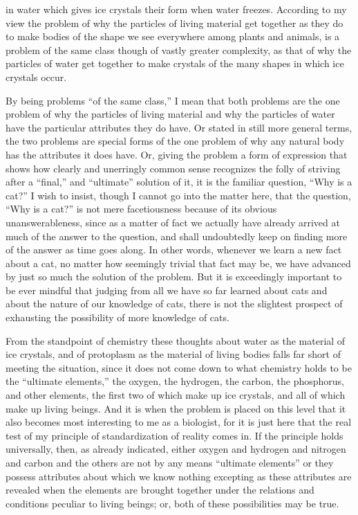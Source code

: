 \documentclass[a4paper, 11pt, oneside, polutonikogreek, english]{article}
\begin{document}
in water which gives ice crystals their form when water freezes. According to my view the problem of why the particles of living material get together as they do to make bodies of the shape we see everywhere among plants and animals, is a problem of the same class though of vastly greater complexity, as that of why the particles of water get together to make crystals of the many shapes in which ice crystals occur.

By being problems ``of the same class,'' I mean that both problems are the one problem of why the particles of living material and why the particles of water have the particular attributes they do have. Or stated in still more general terms, the two problems are special forms of the one problem of why any natural body has the attributes it does have. Or, giving the problem a form of expression that shows how clearly and unerringly common sense recognizes the folly of striving after a ``final,'' and ``ultimate'' solution of it, it is the familiar question, ``Why is a cat?'' I wish to insist, though I cannot go into the matter here, that the question, ``Why is a cat?'' is not mere facetiousness because of its obvious unanswerableness, since as a matter of fact we actually have already arrived at much of the answer to the question, and shall undoubtedly keep on finding more of the answer as time goes along. In other words, whenever we learn a new fact about a cat, no matter how seemingly trivial that fact may be, we have advanced by just so much the solution of the problem. But it is exceedingly important to be ever mindful that judging from all we have so far learned about cats and about the nature of our knowledge of cats, there is not the slightest prospect of exhausting the possibility of more knowledge of cats.

From the standpoint of chemistry these thoughts about water as the material of ice crystals, and of protoplasm as the material of living bodies falls far short of meeting the situation, since it does not come down to what chemistry holds to be the ``ultimate elements,'' the oxygen, the hydrogen, the carbon, the phosphorus, and other elements, the first two of which make up ice crystals, and all of which make up living beings. And it is when the problem is placed on this level that it also becomes most interesting to me as a biologist, for it is just here that the real test of my principle of standardization of reality comes in. If the principle holds universally, then, as already indicated, either oxygen and hydrogen and nitrogen and carbon and the others are not by any means ``ultimate elements'' or they possess attributes about which we know nothing excepting as these attributes are revealed when the elements are brought together under the relations and conditions peculiar to living beings; or, both of these possibilities may be true.
\end{document}
